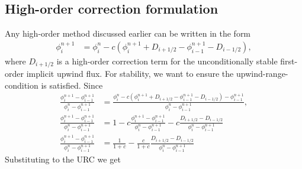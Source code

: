 \documentclass[../thesis.tex]{subfiles}
\begin{document}
\subsection{High-order correction formulation}
Any high-order method discussed earlier can be written in the form
\begin{equation}
    \begin{split}
        \phi_{i}^{n+1}
        &= \phi_{i}^{n} - c\left(
            \phi_{i}^{n+1}
            + D_{i+1/2} - \phi_{i-1}^{n+1}
            - D_{i-1/2} \right),
    \end{split}
\end{equation}
where \(D_{i+1/2}\) is a high-order correction term for the unconditionally stable first-order implicit upwind flux.
For stability, we want to ensure the upwind-range-condition is satisfied.
Since
\begin{equation}
    \begin{split}
        \frac{\phi_{i}^{n+1} - \phi_{i-1}^{n+1}}
            {\phi_{i}^{n} - \phi_{i-1}^{n+1}}
        &=
        \frac{\phi_{i}^{n} - c\left(
                \phi_{i}^{n+1} + D_{i+1/2}
                - \phi_{i-1}^{n+1} - D_{i-1/2}
                \right) - \phi_{i-1}^{n+1}}
            {\phi_{i}^{n} - \phi_{i-1}^{n+1}},
        \\
        \frac{\phi_{i}^{n+1} - \phi_{i-1}^{n+1}}
            {\phi_{i}^{n} - \phi_{i-1}^{n+1}}
        &=
        1 - c\frac{\phi_{i}^{n+1} - \phi_{i-1}^{n+1}}
        {\phi_{i}^{n} - \phi_{i-1}^{n+1}}
        -c\frac{D_{i+1/2} - D_{i-1/2}}
        {\phi_{i}^{n} - \phi_{i-1}^{n+1}}
        \\
        \frac{\phi_{i}^{n+1} - \phi_{i-1}^{n+1}}
            {\phi_{i}^{n} - \phi_{i-1}^{n+1}}
        &=
        \frac{1}{1+c}
        -\frac{c}{1+c}\frac{D_{i+1/2} - D_{i-1/2}}
        {\phi_{i}^{n} - \phi_{i-1}^{n+1}}
    \end{split}
\end{equation}
Substituting to the URC we get
\end{document}
